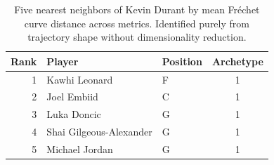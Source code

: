 \begin{table}[htbp]
  \centering\small
  \begin{tabular}{rllc}
    \toprule
    Rank & Player & Position & Archetype \\
    \midrule
    1 & Kawhi Leonard & F & 1 \\
    2 & Joel Embiid & C & 1 \\
    3 & Luka Doncic & G & 1 \\
    4 & Shai Gilgeous-Alexander & G & 1 \\
    5 & Michael Jordan & G & 1 \\
    \bottomrule
  \end{tabular}
  \caption{Five nearest neighbors of Kevin Durant by mean Fr\'{e}chet curve distance across metrics. Identified purely from trajectory shape without dimensionality reduction.}
  \label{tab:Kevin_Durant_frechet_curve_neighbors}
\end{table}

